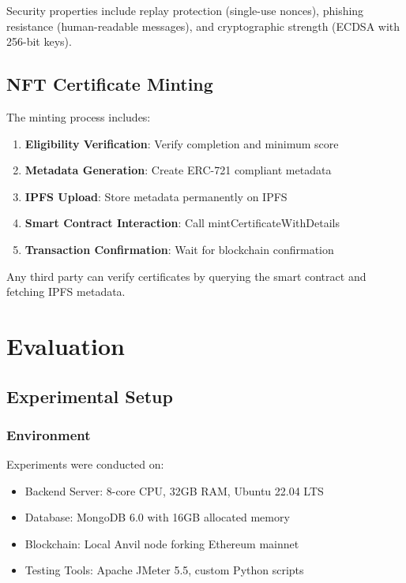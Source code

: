 \documentclass[conference]{IEEEtran}
\begin{document}
Security properties include replay protection (single-use nonces), phishing resistance (human-readable messages), and cryptographic strength (ECDSA with 256-bit keys).

\subsection{NFT Certificate Minting}

The minting process includes:

\begin{enumerate}
    \item \textbf{Eligibility Verification}: Verify completion and minimum score
    \item \textbf{Metadata Generation}: Create ERC-721 compliant metadata
    \item \textbf{IPFS Upload}: Store metadata permanently on IPFS
    \item \textbf{Smart Contract Interaction}: Call mintCertificateWithDetails
    \item \textbf{Transaction Confirmation}: Wait for blockchain confirmation
\end{enumerate}

Any third party can verify certificates by querying the smart contract and fetching IPFS metadata.

\section{Evaluation}

\subsection{Experimental Setup}

\subsubsection{Environment}

Experiments were conducted on:
\begin{itemize}
    \item Backend Server: 8-core CPU, 32GB RAM, Ubuntu 22.04 LTS
    \item Database: MongoDB 6.0 with 16GB allocated memory
    \item Blockchain: Local Anvil node forking Ethereum mainnet
    \item Testing Tools: Apache JMeter 5.5, custom Python scripts
\end{itemize}
\end{document}
